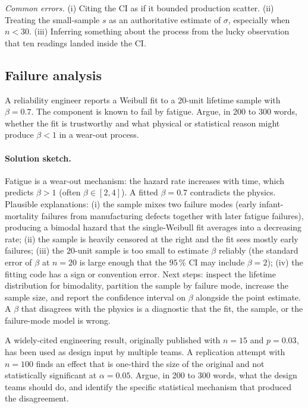 \textit{Common errors.} (i) Citing the CI as if it bounded
production scatter. (ii) Treating the small-sample $s$ as an
authoritative estimate of $\sigma$, especially when $n < 30$.
(iii) Inferring something about the process from the lucky
observation that ten readings landed inside the CI.

\subsection*{Failure analysis}

\begin{exercise}
A reliability engineer reports a Weibull fit to a $20$-unit
lifetime sample with $\beta = 0.7$. The component is known to fail
by fatigue. Argue, in 200 to 300 words, whether the fit is
trustworthy and what physical or statistical reason might produce
$\beta < 1$ in a wear-out process.
\end{exercise}

\paragraph{Solution sketch.}
Fatigue is a wear-out mechanism: the hazard rate increases with
time, which predicts $\beta > 1$ (often $\beta \in [2, 4]$). A
fitted $\beta = 0.7$ contradicts the physics. Plausible
explanations: (i) the sample mixes two failure modes (early
infant-mortality failures from manufacturing defects together
with later fatigue failures), producing a bimodal hazard that the
single-Weibull fit averages into a decreasing rate; (ii) the
sample is heavily censored at the right and the fit sees mostly
early failures; (iii) the $20$-unit sample is too small to
estimate $\beta$ reliably (the standard error of $\beta$ at $n =
20$ is large enough that the $95 \,\%$ CI may include $\beta = 2$);
(iv) the fitting code has a sign or convention error. Next steps:
inspect the lifetime distribution for bimodality, partition the
sample by failure mode, increase the sample size, and report the
confidence interval on $\beta$ alongside the point estimate. A
$\beta$ that disagrees with the physics is a diagnostic that the
fit, the sample, or the failure-mode model is wrong.

\begin{exercise}
A widely-cited engineering result, originally published with $n =
15$ and $p = 0.03$, has been used as design input by multiple
teams. A replication attempt with $n = 100$ finds an effect that
is one-third the size of the original and not statistically
significant at $\alpha = 0.05$. Argue, in 200 to 300 words, what
the design teams should do, and identify the specific statistical
mechanism that produced the disagreement.
\end{exercise}

